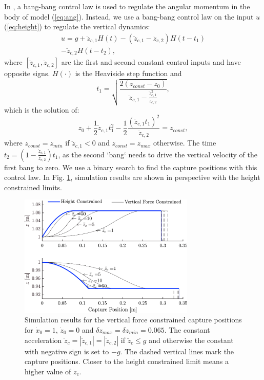 \documentclass[letterpaper, 10 pt, conference]{ieeeconf}  %
\newcommand{\zmin}{z_{min}}
\newcommand{\zmax}{z_{max}}
\newcommand{\ddzcf}{\ddot{z}_{c,1}}
\newcommand{\ddzcs}{\ddot{z}_{c,2}}
\begin{document}
In \cite{pratt2006capture,stephens2007humanoid,koolen2012capturability}, a bang-bang control law is used to regulate the angular momentum in the body of model (\ref{eq:ang}). Instead, we use a bang-bang control law on the input $u$ (\ref{eq:height}) to regulate the vertical dynamics:
\begin{multline}
	u = g + \ddot{z}_{c,1}H(t) - (\ddot{z}_{c,1} - \ddot{z}_{c,2})H(t-t_1) \\ - \ddot{z}_{c,2}H(t-t_2),
\end{multline}
where $[\ddzcf,\ddzcs]$ are the first and second constant control inputs and have opposite signs. $H(\cdot)$ is the Heaviside step function and 
\begin{equation}
t_1=\sqrt{\frac{2(z_{const}-z_0)}{\ddzcf - \frac{\ddzcf^2}{\ddzcs}}},
\end{equation}
which is the solution of:
\begin{equation}
	z_0+\frac{1}{2}\ddzcf t_1^2 - \frac{1}{2}\frac{(\ddzcf t_1)^2}{\ddzcs}= z_{const},
\end{equation}
where $z_{const}=\zmin$ if $\ddzcf <0$ and $z_{const}=\zmax$ otherwise. The time $t_2=(1-\frac{\ddzcf}{\ddzcs})t_1$, as the second `bang` needs to drive the vertical velocity of the first bang to zero. We use a binary search to find the capture positions with this control law. In Fig. \ref{fig:zvsf}, simulation results are shown in perspective with the height constrained limits.
\begin{figure}
      \centering
      \includegraphics[width=3.3in]{heightvsforcelim2.png}
      \caption{Simulation results for the vertical force constrained capture positions for $\dot{x}_0=1$, $\dot{z}_0=0$ and $\delta \zmax=\delta \zmin=0.065$. The constant acceleration $\ddot{z}_c=|\ddzcf|=|\ddzcs|$ if $\ddot{z}_c \leq g$ and otherwise the constant with negative sign is set to $-g$. The dashed vertical lines mark the capture positions. Closer to the height constrained limit means a higher value of $\ddot{z}_c$.}
      \label{fig:zvsf}
\end{figure}
\end{document}
